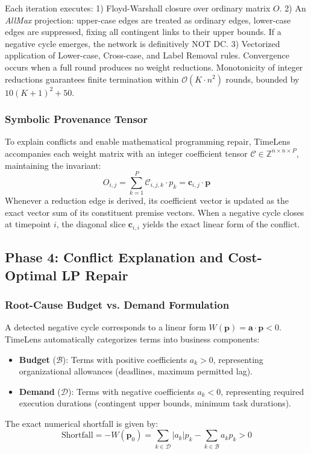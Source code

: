 \documentclass[conference]{IEEEtran}
\begin{document}
Each iteration executes:
1) Floyd-Warshall closure over ordinary matrix $O$.
2) An \textit{AllMax} projection: upper-case edges are treated as ordinary edges, lower-case edges are suppressed, fixing all contingent links to their upper bounds. If a negative cycle emerges, the network is definitively NOT DC.
3) Vectorized application of Lower-case, Cross-case, and Label Removal rules.
Convergence occurs when a full round produces no weight reductions. Monotonicity of integer reductions guarantees finite termination within $\mathcal{O}(K \cdot n^2)$ rounds, bounded by $10(K+1)^2 + 50$.

\subsubsection{Symbolic Provenance Tensor}
To explain conflicts and enable mathematical programming repair, TimeLens accompanies each weight matrix with an integer coefficient tensor $\mathcal{C} \in \mathbb{Z}^{n \times n \times P}$, maintaining the invariant:
\begin{equation}
\label{eq:prov_invariant}
O_{i,j} = \sum_{k=1}^P \mathcal{C}_{i,j,k} \cdot p_k = \mathbf{c}_{i,j} \cdot \mathbf{p}
\end{equation}
Whenever a reduction edge is derived, its coefficient vector is updated as the exact vector sum of its constituent premise vectors. When a negative cycle closes at timepoint $i$, the diagonal slice $\mathbf{c}_{i,i}$ yields the exact linear form of the conflict.

\subsection{Phase 4: Conflict Explanation and Cost-Optimal LP Repair}

\subsubsection{Root-Cause Budget vs. Demand Formulation}
A detected negative cycle corresponds to a linear form $W(\mathbf{p}) = \mathbf{a} \cdot \mathbf{p} < 0$. TimeLens automatically categorizes terms into business components:
\begin{itemize}
    \item \textbf{Budget} ($\mathcal{B}$): Terms with positive coefficients $a_k > 0$, representing organizational allowances (deadlines, maximum permitted lag).
    \item \textbf{Demand} ($\mathcal{D}$): Terms with negative coefficients $a_k < 0$, representing required execution durations (contingent upper bounds, minimum task durations).
\end{itemize}
The exact numerical shortfall is given by:
\begin{equation}
\text{Shortfall} = -W(\mathbf{p}_0) = \sum_{k \in \mathcal{D}} |a_k| p_k - \sum_{k \in \mathcal{B}} a_k p_k > 0
\end{equation}
\end{document}
